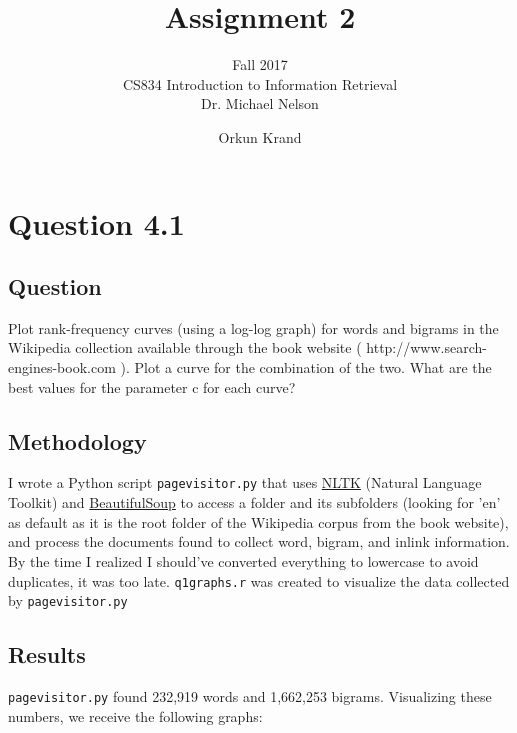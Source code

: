 \documentclass[10pt,letterpaper,bibliography=totoc]{scrartcl}
\begin{document}
\author{Orkun Krand}
\title{Assignment 2}
\subtitle{Fall 2017\\ CS834 Introduction to Information Retrieval\\ Dr. Michael Nelson}
\maketitle
\newpage

\section{Question 4.1}
\subsection {Question}
Plot rank-frequency curves (using a log-log graph) for words and bigrams in the Wikipedia collection available through the book website ( http://www.search-engines-book.com ). Plot a curve for the combination of the two. What are the best values for the parameter c for each curve?

\subsection{Methodology}
I wrote a Python script \texttt{pagevisitor.py} that uses \href{www.nltk.org}{NLTK} (Natural Language Toolkit) and \href{https://www.crummy.com/software/BeautifulSoup/}{BeautifulSoup} to access a folder and its subfolders (looking for 'en' as default as it is the root folder of the Wikipedia corpus from the book website), and process the documents found to collect word, bigram, and inlink information. By the time I realized I should've converted everything to lowercase to avoid duplicates, it was too late. \texttt{q1graphs.r} was created to visualize the data collected by \texttt{pagevisitor.py}

\subsection{Results}
\texttt{pagevisitor.py} found 232,919 words and 1,662,253 bigrams. Visualizing these numbers, we receive the following graphs: 
\end{document}
